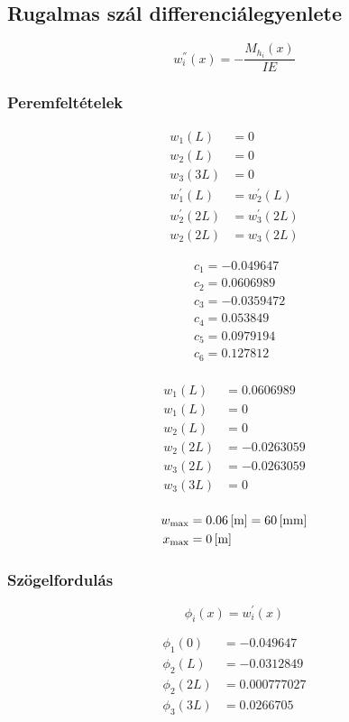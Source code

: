 \subsection{Rugalmas szál differenciálegyenlete}
\begin{equation*}
	w_i^{''}(x) = -\frac{M_{h_i}(x)}{IE}
\end{equation*}

\subsubsection{Peremfeltételek}
\begin{align*}
	w_1(L) &= 0 \\
	w_2(L) &= 0 \\
	w_3(3L) &= 0 \\
	w_1^{'}(L) &= w_2^{'}(L) \\
	w_2^{'}(2L) &= w_3^{'}(2L) \\
	w_2(2L) &= w_3(2L) 
\end{align*}

\begin{align*}
	&c_1 = -0.049647 \\
	&c_2 = 0.0606989 \\
	&c_3 = -0.0359472 \\
	&c_4 = 0.053849 \\
	&c_5 = 0.0979194 \\
	&c_6 = 0.127812 \\
\end{align*}

\begin{align*}
	w_1(L) &= 0.0606989 \\
	w_1(L) &= 0 \\
	w_2(L) &= 0 \\
	w_2(2L) &= -0.0263059 \\
	w_3(2L) &= -0.0263059 \\
	w_3(3L) &= 0 \\
\end{align*}

\begin{align*}
	w_{\text{max}} &= \m{0.06} = \mm{60} \\
	x_{\text{max}} &= \m{0}
\end{align*}

\subsubsection{Szögelfordulás}

\begin{equation*}
	\phi_i(x) = w_i^{'}(x)
\end{equation*}

\begin{align*}
	\phi_1(0) &= -0.049647 \\
	\phi_2(L) &= -0.0312849 \\
	\phi_2(2L) &= 0.000777027 \\
	\phi_3(3L) &= 0.0266705
\end{align*}

